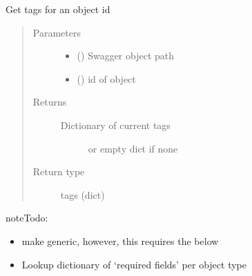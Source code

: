 \documentclass[letterpaper,10pt,english]{sphinxmanual}
\begin{document}
\begin{fulllineitems}
\begin{fulllineitems}
\end{fulllineitems}


\begin{fulllineitems}
\label{\detokenize{b1cdc-class:bloxone.b1cdc.get_tags}}
\sphinxAtStartPar
Get tags for an object id
\begin{quote}\begin{description}
\item[{Parameters}] \leavevmode\begin{itemize}
\item {} 
\sphinxAtStartPar
{} () \textendash{} Swagger object path

\item {} 
\sphinxAtStartPar
{} () \textendash{} id of object

\end{itemize}

\item[{Returns}] \leavevmode
\sphinxAtStartPar
\begin{description}
\item[{Dictionary of current tags}] \leavevmode
\sphinxAtStartPar
or empty dict if none

\end{description}


\item[{Return type}] \leavevmode
\sphinxAtStartPar
tags (dict)

\end{description}\end{quote}

\begin{sphinxadmonition}{note}{\label{\detokenize{b1cdc-class:id1}}Todo:}\begin{itemize}
\item {} 
\sphinxAtStartPar
make generic, however, this requires the below

\item {} 
\sphinxAtStartPar
Lookup dictionary of ‘required fields’ per object type


\end{itemize}
\end{sphinxadmonition}
\end{fulllineitems}
\end{fulllineitems}
\end{document}
